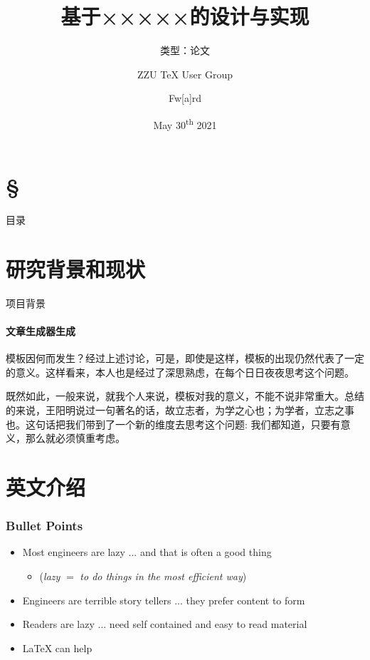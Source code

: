 \documentclass[aspectratio=169]{beamer}
\title{基于×××××的设计与实现}
\subtitle{类型：论文}
\author[{Fw[a]rd}]{ZZU \TeX{} User Group \and Fw[a]rd}
\institute{ZZU \TeX{} User Group}
\date{May 30\textsuperscript{th} 2021}
\begin{document}
\begin{frame}
	\maketitle
\end{frame}

\section*{\S}
\begin{frame}{目录}
	\tableofcontents
\end{frame}

\section{研究背景和现状}

\begin{frame}{项目背景}
    \framesubtitle{文章生成器生成}
{
    \setlength{\parskip}{6pt}
    \setlength{\parindent}{2em}
模板因何而发生？经过上述讨论，可是，即使是这样，模板的出现仍然代表了一定的意义。这样看来，本人也是经过了深思熟虑，在每个日日夜夜思考这个问题。

既然如此，一般来说，就我个人来说，模板对我的意义，不能不说非常重大。总结的来说，王阳明说过一句著名的话，故立志者，为学之心也；为学者，立志之事也。这句话把我们带到了一个新的维度去思考这个问题: 我们都知道，只要有意义，那么就必须慎重考虑。 
}
\end{frame}

\section{英文介绍}
\begin{frame}
\frametitle{Bullet Points}
\vspace{-0.3cm}
\begin{itemize}[<+->]
	\item Most engineers are lazy ... and that is often a good thing
	\begin{itemize}[<+->]
		\item (\textit{lazy} $=$ \textit{to do things in the most efficient way})
	\end{itemize}
	\item Engineers are terrible story tellers ... they prefer content to form
	\item Readers are lazy ... need self contained and easy to read material
	\item \LaTeX{} can help
\end{itemize}
\end{frame}
\end{document}
